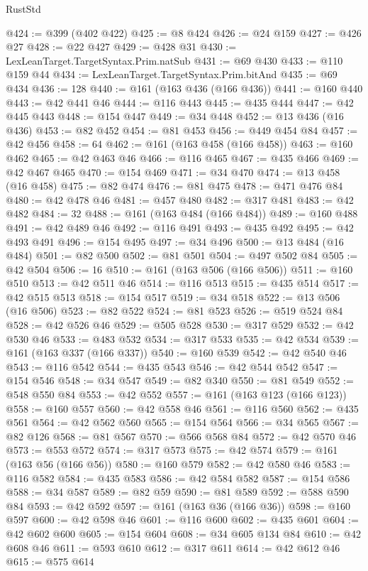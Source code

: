 \begin{lexlean}{RustStd}
\begin{coremodule}
{\begin{coremodule}
{{{{{{{{{{{{{{@424 := @399 (@402 @422)
@425 := @8 @424
@426 := @24 @159
@427 := @426 @27
@428 := @22 @427
@429 := @428 @31
@430 := LexLeanTarget.TargetSyntax.Prim.natSub
@431 := @69 @430
@433 := @110 @159 @44
@434 := LexLeanTarget.TargetSyntax.Prim.bitAnd
@435 := @69 @434
@436 := 128
@440 := @161 (@163 @436 (@166 @436))
@441 := @160 @440
@443 := @42 @441 @46
@444 := @116 @443
@445 := @435 @444
@447 := @42 @445 @443
@448 := @154 @447
@449 := @34 @448
@452 := @13 @436 (@16 @436)
@453 := @82 @452
@454 := @81 @453
@456 := @449 @454 @84
@457 := @42 @456
@458 := 64
@462 := @161 (@163 @458 (@166 @458))
@463 := @160 @462
@465 := @42 @463 @46
@466 := @116 @465
@467 := @435 @466
@469 := @42 @467 @465
@470 := @154 @469
@471 := @34 @470
@474 := @13 @458 (@16 @458)
@475 := @82 @474
@476 := @81 @475
@478 := @471 @476 @84
@480 := @42 @478 @46
@481 := @457 @480
@482 := @317 @481
@483 := @42 @482
@484 := 32
@488 := @161 (@163 @484 (@166 @484))
@489 := @160 @488
@491 := @42 @489 @46
@492 := @116 @491
@493 := @435 @492
@495 := @42 @493 @491
@496 := @154 @495
@497 := @34 @496
@500 := @13 @484 (@16 @484)
@501 := @82 @500
@502 := @81 @501
@504 := @497 @502 @84
@505 := @42 @504
@506 := 16
@510 := @161 (@163 @506 (@166 @506))
@511 := @160 @510
@513 := @42 @511 @46
@514 := @116 @513
@515 := @435 @514
@517 := @42 @515 @513
@518 := @154 @517
@519 := @34 @518
@522 := @13 @506 (@16 @506)
@523 := @82 @522
@524 := @81 @523
@526 := @519 @524 @84
@528 := @42 @526 @46
@529 := @505 @528
@530 := @317 @529
@532 := @42 @530 @46
@533 := @483 @532
@534 := @317 @533
@535 := @42 @534
@539 := @161 (@163 @337 (@166 @337))
@540 := @160 @539
@542 := @42 @540 @46
@543 := @116 @542
@544 := @435 @543
@546 := @42 @544 @542
@547 := @154 @546
@548 := @34 @547
@549 := @82 @340
@550 := @81 @549
@552 := @548 @550 @84
@553 := @42 @552
@557 := @161 (@163 @123 (@166 @123))
@558 := @160 @557
@560 := @42 @558 @46
@561 := @116 @560
@562 := @435 @561
@564 := @42 @562 @560
@565 := @154 @564
@566 := @34 @565
@567 := @82 @126
@568 := @81 @567
@570 := @566 @568 @84
@572 := @42 @570 @46
@573 := @553 @572
@574 := @317 @573
@575 := @42 @574
@579 := @161 (@163 @56 (@166 @56))
@580 := @160 @579
@582 := @42 @580 @46
@583 := @116 @582
@584 := @435 @583
@586 := @42 @584 @582
@587 := @154 @586
@588 := @34 @587
@589 := @82 @59
@590 := @81 @589
@592 := @588 @590 @84
@593 := @42 @592
@597 := @161 (@163 @36 (@166 @36))
@598 := @160 @597
@600 := @42 @598 @46
@601 := @116 @600
@602 := @435 @601
@604 := @42 @602 @600
@605 := @154 @604
@608 := @34 @605 @134 @84
@610 := @42 @608 @46
@611 := @593 @610
@612 := @317 @611
@614 := @42 @612 @46
@615 := @575 @614
}}}}}}}}}}}}}}
\end{coremodule}}
\end{coremodule}
\end{lexlean}
